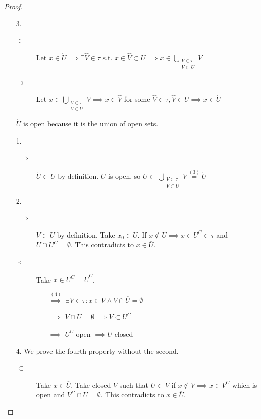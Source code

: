 \documentclass{article}
\numberwithin{lecref}{section}
\begin{document}
\begin{proof}
	\begin{enumerate}
		\item[3.]
		  \begin{description}
		  	\item[$\subset$] Let $x \in \mathring U \implies \exists \hat V \in \tau$ s.t. $x \in \hat V \subset U \implies x \in \bigcup_{\substack{V \in \tau \\ V \subset U}} V$
		  	\item[$\supset$] Let $x \in \bigcup_{\substack{V \in \tau \\ V \in U}} V \implies x \in \hat V$ for some $\hat V \in \tau, \hat V \in U \implies x \in \mathring U$
		  \end{description}
		  $\mathring U$ is open because it is the union of open sets.
		\item[1.]
			\begin{description}
				\item[$\implies$]
					$\mathring U \subset U$ by definition.
					$U$ is open, so $U \subset \bigcup_{\substack{V \subset \tau \\ V \subset U}} V \overset{(3)}{=} \mathring U$
			\end{description}
		\item[2.]
			\begin{description}
				\item[$\implies$]
					$V \subset \overline{U}$ by definition.
					Take $x_0 \in \overline U$. If $x \not\in U \implies x \in U^C \in \tau$ and $U \cap U^C = \emptyset$. This contradicts to $x \in \overline U$.
				\item[$\impliedby$]
					Take $x \in U^C = \overline U^C$.
					\begin{itemize}
						\item[$\overset{(4)}{\implies}$] $\exists V \in \tau: x \in V \land V \cap \overline U = \emptyset$
						\item[$\implies$] $V \cap U = \emptyset \implies V \subset U^C$
						\item[$\implies$] $U^C$ open $\implies U$ closed
					\end{itemize}
			\end{description}
		\item[4.]
			We prove the fourth property without the second.
			\begin{description}
				\item[$\subset$]
					Take $x \in \overline{U}$. Take closed $V$ such that $U \subset V$ if $x \not\in V \implies x \in V^C$ which is open and $V^C \cap U = \emptyset$. This contradicts to $x \in \overline U$.

\end{description}
\end{enumerate}
\end{proof}
\end{document}
